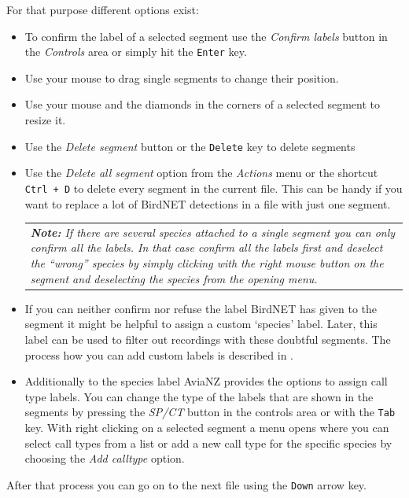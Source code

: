 \documentclass{scrartcl}
\begin{document}
For that purpose different options exist:
\begin{itemize}
	\item To confirm the label of a selected segment use the \textit{Confirm labels} button in the \textit{Controls} area or simply hit the \texttt{Enter} key.
	\item Use your mouse to drag single segments to change their position.
	\item Use your mouse and the diamonds in the corners of a selected segment to resize it.
	\item Use the \textit{Delete segment} button or the \texttt{Delete} key to delete segments
	\item Use the \textit{Delete all segment} option from the \textit{Actions} menu or the shortcut \texttt{Ctrl + D} to delete every segment in the current file. 
		This can be handy if you want to replace a lot of BirdNET detections in a file with just one segment.
	\begin{table}[h!]
		\centering
		\begin{tabular}{p{}}
			\textit{\textbf{Note:} If there are several species attached to a single segment you can only confirm all the labels. In that case confirm all the labels first and deselect the ``wrong'' species by simply clicking with the right mouse button on the segment and deselecting the species from the opening menu.}\\
		\end{tabular}
	\end{table}
\item If you can neither confirm nor refuse the label BirdNET has given to the segment it might be helpful to assign a custom `species' label. Later, this label can be used to filter out recordings with these doubtful segments. The process how you can add custom labels is described in .
	\item Additionally to the species label AviaNZ provides the options to assign call type labels. 
		You can change the type of the labels that are shown in the segments by pressing the \textit{SP/CT} button in the controls area or with the \texttt{Tab} key.
		With right clicking on a selected segment a menu opens where you can select call types from a list or add a new call type for the specific species by choosing the \textit{Add calltype} option.
\end{itemize}

After that process you can go on to the next file using the \texttt{Down} arrow key.
\end{document}
